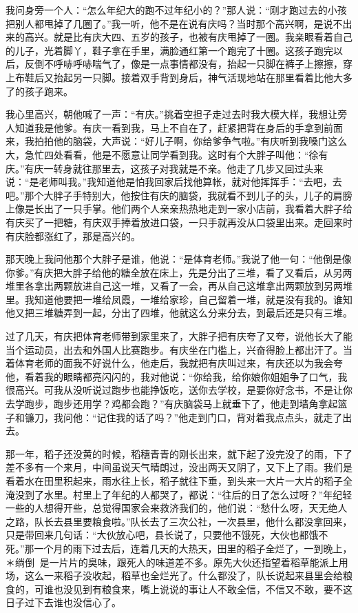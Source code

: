 \documentclass[12pt,UTF8]{ctexbook}
\begin{document}
我问身旁一个人：“怎么年纪大的跑不过年纪小的？”那人说：“刚才跑过去的小孩把别人都甩掉了几圈了。”我一听，他不是在说有庆吗？当时那个高兴啊，是说不出来的高兴。就是比有庆大四、五岁的孩子，也被有庆甩掉了一圈。我亲眼看着自己的儿子，光着脚丫，鞋子拿在手里，满脸通红第一个跑完了十圈。这孩子跑完以后，反倒不呼哧呼哧喘气了，像是一点事情都没有，抬起一只脚在裤子上擦擦，穿上布鞋后又抬起另一只脚。接着双手背到身后，神气活现地站在那里看着比他大多了的孩子跑来。

我心里高兴，朝他喊了一声：“有庆。”挑着空担子走过去时我大模大样，我想让旁人知道我是他爹。有庆一看到我，马上不自在了，赶紧把背在身后的手拿到前面来，我拍拍他的脑袋，大声说：“好儿子啊，你给爹争气啦。”有庆听到我嗓门这么大，急忙四处看看，他是不愿意让同学看到我。这时有个大胖子叫他：“徐有庆。”有庆一转身就往那里去，这孩子对我就是不亲。他走了几步又回过头来说：“是老师叫我。”我知道他是怕我回家后找他算帐，就对他挥挥手：“去吧，去吧。”那个大胖子手特别大，他按住有庆的脑袋，我就看不到儿子的头，儿子的肩膀上像是长出了一只手掌。他们两个人亲亲热热地走到一家小店前，我看着大胖子给有庆买了一把糖，有庆双手捧着放进口袋，一只手就再没从口袋里出来。走回来时有庆脸都涨红了，那是高兴的。

那天晚上我问他那个大胖子是谁，他说：“是体育老师。”我说了他一句：“他倒是像你爹。”有庆把大胖子给他的糖全放在床上，先是分出了三堆，看了又看后，从另两堆里各拿出两颗放进自己这一堆，又看了一会，再从自己这堆拿出两颗放到另两堆里。我知道他要把一堆给凤霞，一堆给家珍，自己留着一堆，就是没有我的。谁知他又把三堆糖弄到一起，分出了四堆，他就这么分来分去，到最后还是只有三堆。

过了几天，有庆把体育老师带到家里来了，大胖子把有庆夸了又夸，说他长大了能当个运动员，出去和外国人比赛跑步。有庆坐在门槛上，兴奋得脸上都出汗了。当着体育老师的面我不好说什么，他走后，我就把有庆叫过来，有庆还以为我会夸他，看着我的眼睛都亮闪闪的，我对他说：“你给我，给你娘你姐姐争了口气，我很高兴。可我从没听说过跑步也能挣饭吃，送你去学校，是要你好念书，不是让你去学跑步，跑步还用学？鸡都会跑？”有庆脑袋马上就垂下了，他走到墙角拿起篮子和镰刀，我问他：“记住我的话了吗？”他走到门口，背对着我点点头，就走了出去。

那一年，稻子还没黄的时候，稻穗青青的刚长出来，就下起了没完没了的雨，下了差不多有一个来月，中间虽说天气晴朗过，没出两天又阴了，又下上了雨。我们是看着水在田里积起来，雨水往上长，稻子就往下垂，到头来一大片一大片的稻子全淹没到了水里。村里上了年纪的人都哭了，都说：“往后的日了怎么过呀？”年纪轻一些的人想得开些，总觉得国家会来救济我们的，他们说：“愁什么呀，天无绝人之路，队长去县里要粮食啦。”队长去了三次公社，一次县里，他什么都没拿回来，只是带回来几句话：“大伙放心吧，县长说了，只要他不饿死，大伙也都饿不死。”那一个月的雨下过去后，连着几天的大热天，田里的稻子全烂了，一到晚上，＊绱倒＊是一片片的臭味，跟死人的味道差不多。原先大伙还指望着稻草能派上用场，这么一来稻子没收起，稻草也全烂光了。什么都没了，队长说起来县里会给粮食的，可谁也没见到有粮食来，嘴上说说的事让人不敢全信，不信又不敢，要不这日子过下去谁也没信心了。
\end{document}
